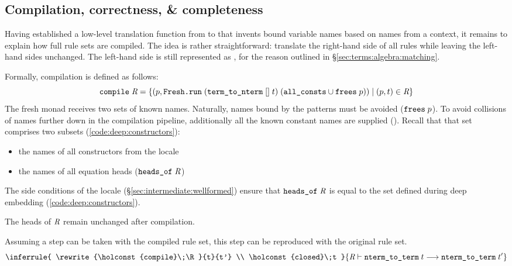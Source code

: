 \subsection{Compilation, correctness, \& completeness}
\label{sec:intermediate:named:compilation}

Having established a low-level translation function from  to  that invents bound variable names based on names from a context, it remains to explain how full rule sets are compiled.
The idea is rather straightforward:
translate the right-hand side of all rules while leaving the left-hand sides unchanged.
The left-hand side is still represented as , for the reason outlined in §\ref{sec:terms:algebra:matching}.

Formally, compilation is defined as follows:
\[
  \texttt{\textup{compile}}\;\textit{R} = \{ (p, \texttt{\textup{Fresh.run}}\;(\texttt{\textup{term\_to\_nterm}}\;[]\;t)\;(\texttt{\textup{all\_consts}} \cup \texttt{\textup{frees}}\;p)) \mid (p, t) \in \textit{R} \}
\]
%
The fresh monad receives two sets of known names.
Naturally, names bound by the patterns must be avoided ($\texttt{\textup{frees}}\;p$).
To avoid collisions of names further down in the compilation pipeline, additionally all the known constant names are supplied ().
Recall that that set comprises two subsets (\cref{code:deep:constructors}):
\begin{itemize}
  \item the names of all constructors from the  locale
  \item the names of all equation heads ($\texttt{\textup{heads\_of}}\;\textit{R}$)
\end{itemize}
%
The side conditions of the locale (§\ref{sec:intermediate:wellformed}) ensure that $\texttt{\textup{heads\_of}}\;\textit{R}$ is equal to the set  defined during deep embedding (\cref{code:deep:constructors}).

\begin{corollary}
  The heads of $\textit{R}$ remain unchanged after compilation.
\end{corollary}

\begin{theorem}\label{thm:intermediate:named}
  Assuming a step can be taken with the compiled rule set, this step can be reproduced with the original rule set.
  \[
    \inferrule{
      \rewrite{\holconst{compile}\;\R}{t}{t'} \\
      \holconst{closed}\;t
    }{
      \rewrite\R{\holconst{nterm\_to\_term}\;t}{\holconst{nterm\_to\_term}\;t'}
    }
  \]
\end{theorem}

